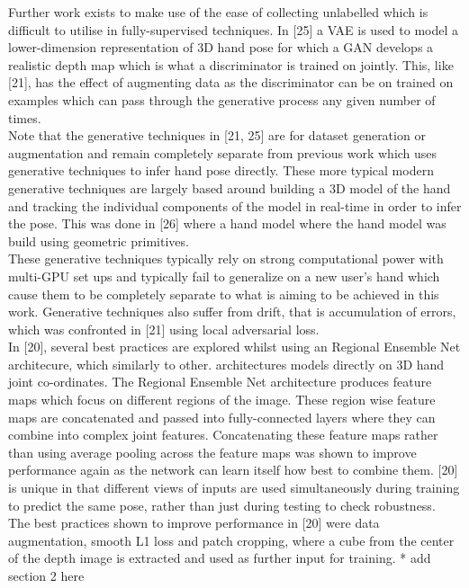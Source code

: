 \documentclass{article}
\begin{document}
Further work exists to make use of the ease of collecting unlabelled which is difficult to utilise in fully-supervised techniques. In [25] a VAE is used to model a lower-dimension representation of 3D hand pose for which a GAN develops a realistic depth map which is what a discriminator is trained on jointly. This, like [21], has the effect of augmenting data as the discriminator can be on trained on examples which can pass through the generative process any given number of times.\\

Note that the generative techniques in [21, 25] are for dataset generation or augmentation and remain completely separate from previous work which uses generative techniques to infer hand pose directly. These more typical modern generative techniques are largely based around building a 3D model of the hand and tracking the individual components of the model in real-time in order to infer the pose. This was done  in [26] where a hand model  where the hand model was build using geometric primitives.\\

These generative techniques typically rely on strong computational power with multi-GPU set ups and typically fail to generalize on a new user's hand which cause them to be completely separate to what is aiming to be achieved in this work. Generative techniques also suffer from drift, that is accumulation of errors, which was confronted in [21] using local adversarial loss.\\ 

In [20], several best practices are explored whilst using an Regional Ensemble Net architecure, which similarly to other. architectures models directly on 3D hand joint co-ordinates. The Regional Ensemble Net architecture produces feature maps which focus on different regions of the image. These region wise feature maps are concatenated and passed into fully-connected layers where they can combine into complex joint features. Concatenating these feature maps rather than using average pooling across the feature maps was shown to improve performance again as the network can learn itself how best to combine them. [20] is unique in that different views of inputs are used simultaneously during training to predict the same pose, rather than just during testing to check robustness. \\

The best practices shown to improve performance in [20] were data augmentation, smooth L1 loss and patch cropping, where a cube from the center of the depth image is extracted and used as further input for training. * add section 2 here
\end{document}

